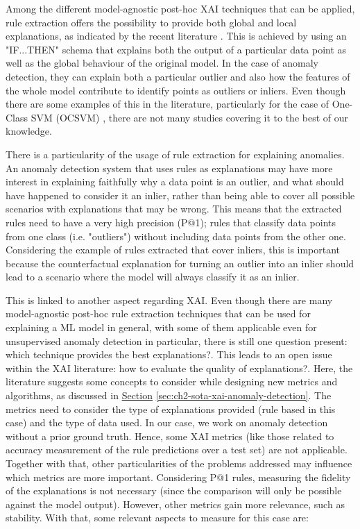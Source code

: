 Among the different model-agnostic post-hoc XAI techniques that can be applied, rule extraction offers the possibility to provide both global and local explanations, as indicated by the recent literature \parencite{arrieta2020explainable}. This is achieved by using an "IF...THEN" schema that explains both the output of a particular data point as well as the global behaviour of the original model. In the case of anomaly detection, they can explain both a particular outlier and also how the features of the whole model contribute to identify points as outliers or inliers. Even though there are some examples of this in the literature, particularly for the case of One-Class SVM (OCSVM) \parencite{padmaja2015hybrid}, there are not many studies covering it to the best of our knowledge.

There is a particularity of the usage of rule extraction for explaining anomalies. An anomaly detection system that uses rules as explanations may have more interest in explaining faithfully why a data point is an outlier, and what should have happened to consider it an inlier, rather than being able to cover all possible scenarios with explanations that may be wrong. This means that the extracted rules need to have a very high precision (P@1); rules that classify data points from one class (i.e. "outliers") without including data points from the other one. Considering the example of rules extracted that cover inliers, this is important because the counterfactual explanation for turning an outlier into an inlier should lead to a scenario where the model will always classify it as an inlier.

This is linked to another aspect regarding XAI. Even though there are many model-agnostic post-hoc rule extraction techniques that can be used for explaining a ML model in general, with some of them applicable even for unsupervised anomaly detection in particular, there is still one question present: which technique provides the best explanations?. This leads to an open issue within the XAI literature: how to evaluate the quality of explanations?. Here, the literature suggests some concepts to consider while designing new metrics and algorithms, as discussed in \hyperref[sec:ch2-sota-xai-anomaly-detection]{Section} \ref{sec:ch2-sota-xai-anomaly-detection}. The metrics need to consider the type of explanations provided (rule based in this case) and the type of data used. In our case, we work on anomaly detection without a prior ground truth. Hence, some XAI metrics (like those related to accuracy measurement of the rule predictions over a test set) are not applicable. Together with that, other particularities of the problems addressed may influence which metrics are more important. Considering P@1 rules, measuring the fidelity of the explanations is not necessary (since the comparison will only be possible against the model output). However, other metrics gain more relevance, such as stability. With that, some relevant aspects to measure for this case are: 

